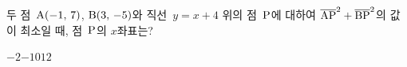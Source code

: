 두 점~$\mathrm{A}(-1,\mkern3mu 7)$, $\mathrm{B}(3,\mkern3mu -5)$와 직선~$y=x+4$ 위의 점~$\mathrm{P}$에 대하여 $\overline{\mathrm{AP}}^2+\overline{\mathrm{BP}}^2$의 값이 최소일 때, 점~$\mathrm{P}$의 $x$좌표는?
\begin{choices32}{$-2$}{$-1$}{$0$}{$1$}{$2$}\end{choices32}
